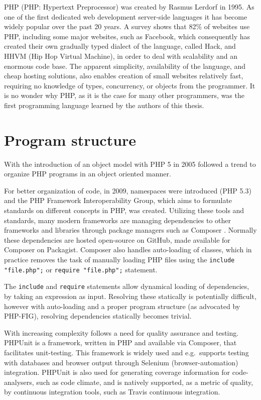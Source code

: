PHP (PHP: Hypertext Preprocessor) was created by Rasmus Lerdorf in 1995. As one of the first dedicated web development server-side languages it has become widely popular over the past 20 years. A survey shows that 82\% of websites use PHP, including some major websites, such as Facebook, which consequently has created their own gradually typed dialect of the language, called Hack, and HHVM (Hip Hop Virtual Machine), in order to deal with scalability and an enormous code base. The apparent simplicity, availability of the language, and cheap hosting solutions,  also enables creation of small websites relatively fast, requiring no knowledge of types, concurrency, or objects from the programmer. It is no wonder why PHP, as it is the case for many other programmers, was the first programming language learned by the authors of this thesis.

\section{Program structure}
\label{sec:bgProgStuc}
With the introduction of an object model with PHP 5 in 2005 followed a trend to organize PHP programs in an object oriented manner. 

For better organization of code, in 2009, namespaces were introduced (PHP 5.3) and the PHP Framework Interoperability Group, which aims to formulate standards on different concepts in PHP, was created. Utilizing these tools and standards, many modern frameworks are managing dependencies to other frameworks and libraries through package managers such as Composer . Normally these dependencies are hosted open-source on GitHub, made available for Composer on Packagist. Composer also handles auto-loading of classes, which in practice removes the task of manually loading PHP files using the \texttt{include "file.php";} or \texttt{require "file.php";} statement. 

The \texttt{include} and \texttt{require} statements allow dynamical loading of dependencies, by taking an expression as input. Resolving these statically is potentially difficult, however with auto-loading and a proper program structure (as advocated by PHP-FIG), resolving dependencies statically becomes trivial.

With increasing complexity follows a need for quality assurance and testing. PHPUnit is a framework, written in PHP and available via Composer, that facilitates unit-testing. This framework is widely used and e.g.\ supports testing with databases and browser output through Selenium (browser-automation) integration. PHPUnit is also used for generating coverage information for code-analysers, such as code climate, and is natively supported, as a metric of quality, by continuous integration tools, such as Travis continuous integration. 

